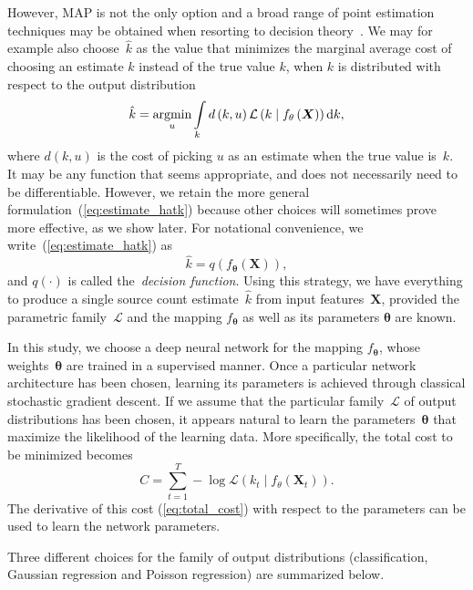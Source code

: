 However, MAP is not the only option and a broad range of point estimation techniques may be obtained when resorting to decision theory~\cite{berger1985}.
We may for example also choose~$\hat{k}$ as the value that minimizes the marginal average cost of choosing an estimate $\hat{k}$ instead of the true value $k$, when $k$ is distributed with respect to the output distribution
\begin{equation}
\hat{k}=\underset{u}{\text{argmin}}\intop_{k}d\left(k,u\right)\mathcal{L}\left(k\mid f_{\mathbf{\theta}}\left(\boldsymbol{X}\right)\right) \mathrm{d} k,\label{eq:estimate_hatk}
\end{equation}
where $d\left(k,u\right)$ is the cost of picking $u$ as an estimate when the true value is~$k$.
It may be any function that seems appropriate, and does not necessarily need to be differentiable.
However, we retain the more general formulation~(\ref{eq:estimate_hatk}) because other choices will sometimes prove more effective, as we show later.
For notational convenience, we write~(\ref{eq:estimate_hatk}) as
\begin{equation}
\hat{k}=q\left(f_{\mathbf{\theta}}\left(\boldsymbol{X}\right)\right),
\end{equation}
and $q\left(\cdot\right)$ is called the~\textit{decision function}.
Using this strategy, we have everything to produce a single source count estimate~$\hat{k}$ from input features~$\mathbf{X}$, provided the parametric family~$\mathcal{L}$ and the mapping $f_{\mathbf{\theta}}$ as well as its parameters $\mathbf{\theta}$ are known.

In this study, we choose a deep neural network for the mapping $f_{\mathbf{\theta}}$, whose weights~$\mathbf{\theta}$ are trained in a supervised manner.
Once a particular network architecture has been chosen, learning its parameters is achieved through classical stochastic gradient descent.
If we assume that the particular family~$\mathcal{L}$ of output distributions has been chosen, it appears natural to learn the parameters~$\mathbf{\theta}$ that maximize the likelihood of the learning data.
More specifically, the total cost to be minimized becomes
\begin{equation}
C=\sum_{t=1}^{T}-\log\mathcal{L}\left(k_{t}\mid f_{\theta}\left(\boldsymbol{X}_{t}\right)\right).\label{eq:total_cost}
\end{equation}
The derivative of this cost (\ref{eq:total_cost}) with respect to the parameters can be used to learn the network parameters.
\par
Three different choices for the family of output distributions (classification, Gaussian regression and Poisson regression) are summarized below.


